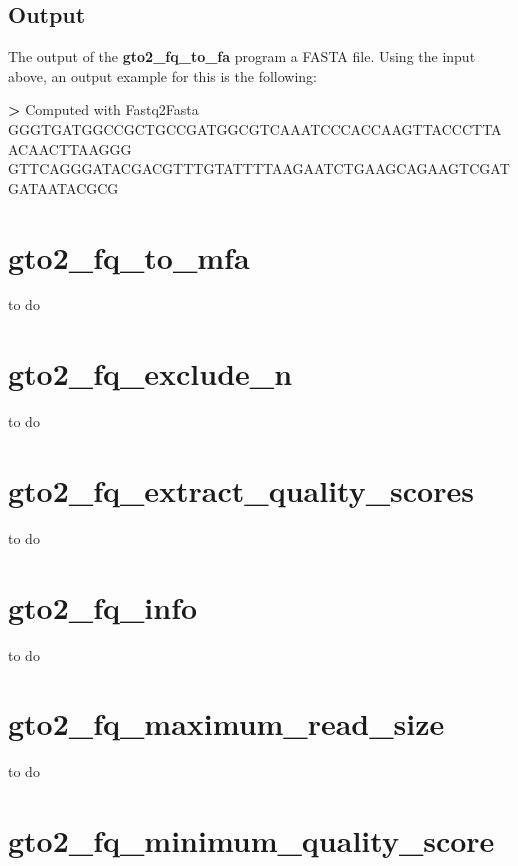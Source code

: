 \documentclass[11pt,]{krantz}
\newenvironment{Shaded}{\begin{snugshade}}{\end{snugshade}}
\newcommand{\OperatorTok}[1]{\textcolor[rgb]{0.43,0.43,0.43}{\textbf{#1}}}
\newcommand{\ExtensionTok}[1]{#1}
\newcommand{\NormalTok}[1]{#1}
\begin{document}
\subsection*{Output}\label{output}


The output of the \textbf{gto2\_fq\_to\_fa} program a FASTA file. Using
the input above, an output example for this is the following:

\begin{Shaded}
\begin{Highlighting}[]
\OperatorTok{>} \ExtensionTok{Computed}\NormalTok{ with Fastq2Fasta}
\ExtensionTok{GGGTGATGGCCGCTGCCGATGGCGTCAAATCCCACCAAGTTACCCTTAACAACTTAAGGG}
\ExtensionTok{GTTCAGGGATACGACGTTTGTATTTTAAGAATCTGAAGCAGAAGTCGATGATAATACGCG}
\end{Highlighting}
\end{Shaded}

\section{gto2\_fq\_to\_mfa}\label{gto2_fq_to_mfa}

to do

\section{gto2\_fq\_exclude\_n}\label{gto2_fq_exclude_n}

to do

\section{gto2\_fq\_extract\_quality\_scores}\label{gto2_fq_extract_quality_scores}

to do

\section{gto2\_fq\_info}\label{gto2_fq_info}

to do

\section{gto2\_fq\_maximum\_read\_size}\label{gto2_fq_maximum_read_size}

to do

\section{gto2\_fq\_minimum\_quality\_score}\label{gto2_fq_minimum_quality_score}
\end{document}
